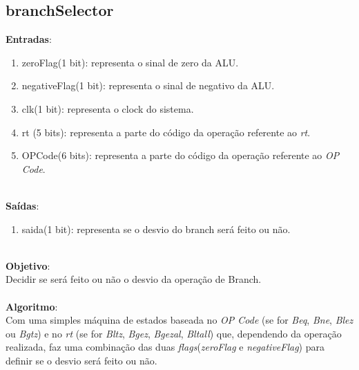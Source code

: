 \documentclass{article}
\begin{document}
    \subsection{branchSelector}
    \textbf{Entradas}:
   \begin{enumerate}
        \item zeroFlag(1 bit): representa o sinal de zero da ALU.
        \item negativeFlag(1 bit): representa o sinal de negativo da ALU.
        \item clk(1 bit): representa o clock do sistema.
        \item rt (5 bits): representa a parte do código da operação referente ao {\it rt}.
        \item OPCode(6 bits): representa a parte do código da operação referente ao {\it OP Code}.\\
    \end{enumerate}
    \\
    \textbf{Saídas}:
    \begin{enumerate}
        \item saida(1 bit): representa se o desvio do branch será feito ou não.\\
    \end{enumerate}
    \\
    \textbf{Objetivo}:\\
    Decidir se será feito ou não o desvio da operação de Branch.
    \\
    \\
    \textbf{Algoritmo}:\\
    Com uma simples máquina de estados baseada no {\it OP Code} (se for {\it Beq}, {\it Bne}, {\it Blez} ou {\it Bgtz}) e no {\it rt} (se for {\it Bltz}, {\it Bgez}, {\it Bgezal}, {\it Bltall}) que, dependendo da operação realizada, faz uma combinação das duas {\it flags}({\it zeroFlag} e {\it negativeFlag}) para definir se o desvio será feito ou não.
    \\
\end{document}
